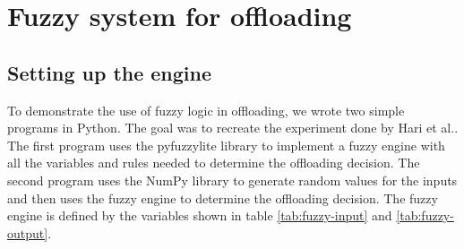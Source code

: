 \section{Fuzzy system for offloading}

\subsection{Setting up the engine}

To demonstrate the use of fuzzy logic in offloading, we wrote two simple programs in Python. The goal was to recreate
the experiment done by Hari et al.\cite{Hari-et-al-2018}. The first program uses the pyfuzzylite\cite{fuzzylite} library
to implement a fuzzy engine with all the variables and rules needed to determine the offloading decision. The second
program uses the NumPy library to generate random values for the inputs and then uses the fuzzy engine to determine
the offloading decision. The fuzzy engine is defined by the variables shown in table \ref{tab:fuzzy-input} and
\ref{tab:fuzzy-output}.

